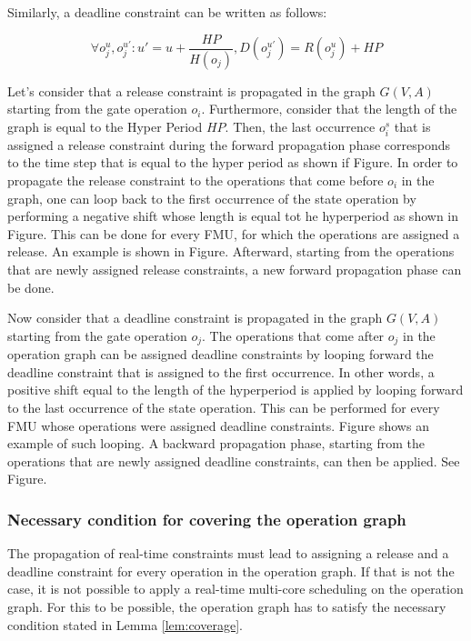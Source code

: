Similarly, a deadline constraint can be written as follows:

\begin{equation}
\forall o_j^u, o_j^{u'}: u' = u + \frac{HP}{H(o_j)}, D(o_j^{u'}) = R(o_j^u) + HP
\label{eq:release}
\end{equation}

Let's consider that a release constraint is propagated in the graph $G(V,A)$ starting from the gate operation $o_i$.  Furthermore, consider that the length of the graph is equal to the Hyper Period $HP$. Then, the last occurrence $o_i^s$ that is assigned a release constraint during the forward propagation phase corresponds to the time step that is equal to the hyper period as shown if Figure. In order to propagate the release constraint to the operations that come before $o_i$ in the graph, one can loop back to the first occurrence of the state operation by performing a negative shift whose length is equal tot he hyperperiod as shown in Figure. This can be done for every FMU, for which the operations are assigned a release. An example is shown in Figure. Afterward, starting from the operations that are newly assigned release constraints, a new forward propagation phase can be done.  

Now consider that a deadline constraint is propagated in the graph $G(V,A)$ starting from the gate operation $o_j$. The operations that come after $o_j$ in the operation graph can be assigned deadline constraints by looping forward the deadline constraint that is assigned to the first occurrence. In other words, a positive shift equal to the length of the hyperperiod is applied by looping forward to the last occurrence of the state operation. This can be performed for every FMU whose operations were assigned deadline constraints. Figure shows an example of such looping. A backward propagation phase, starting from the operations that are newly assigned deadline constraints, can then be applied. See Figure. 

\subsubsection{Necessary condition for covering the operation graph}

The propagation of real-time constraints must lead to assigning a release and a deadline constraint for every operation in the operation graph. If that is not the case, it is not possible to apply a real-time multi-core scheduling on the operation graph. For this to be possible, the operation graph has to satisfy the necessary condition stated in Lemma \ref{lem:coverage}.

